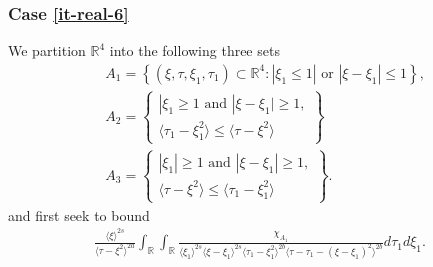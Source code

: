 \documentclass[12pt,reqno]{amsart}
\numberwithin{equation}{section}  %
\numberwithin{figure}{section}
\newcommand{\rr}{\mathbb{R}}
\theoremstyle{plain}
\theoremstyle{definition}
\theoremstyle{remark}
\begin{document}
 \subsubsection{Case \eqref{it-real-6}} 
\label{sssec:case-it-real-6}
We partition $\rr^{4}$ into the following three sets 
%
%
\begin{equation*}
\begin{split}
  & A_{1} = \left\{ (\xi, \tau, \xi_{1}, \tau_{1}) \subset \rr^{4}: |
  \xi_{1} \le 1 | \text{ or } | \xi - \xi_{1} | \le 1 \right\},
  \\
  & A_{2} = 
  \begin{Bmatrix}
    | \xi_{1} \ge 1 \text{ and } | \xi - \xi_{1} | \ge 1,
    \\
    \langle \tau_{1} - \xi_{1}^{2} \rangle  \le \langle \tau -
  \xi^{2} \rangle
\end{Bmatrix}
  \\
  & A_{3} = 
  \begin{Bmatrix}
    | \xi_{1} | \ge 1 \text{ and } | \xi - \xi_{1} | \ge 1,
    \\
    \langle \tau - \xi^{2} \rangle  \le \langle \tau_{1} - \xi_{1}^{2} \rangle 
  \end{Bmatrix}.
\end{split}
\end{equation*}
%
and first seek to bound
%
%
\begin{equation}
  \label{case-1-region-1}
  \begin{split}
    \frac{ \langle \xi
    \rangle ^{2s}}{\langle \tau - \xi^{2} \rangle ^{2a}}
    \int_{\rr} \int_{\rr} \frac{\chi_{A_{1}}}{ \langle \xi_{1} \rangle ^{2s} \langle \xi-\xi_{1} \rangle ^{2s} 
    \langle \tau_{1} - \xi_{1}^{2} \rangle^{2b} \langle  \tau - \tau_{1} -
    (\xi - \xi_{1})^{2} \rangle^{2b} }
    d \tau_1 d \xi_{1}.
  \end{split}
\end{equation}
\end{document}
